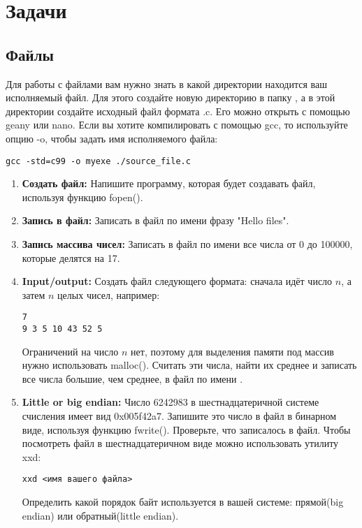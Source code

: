 \documentclass{article}
\begin{document}
\section*{Задачи}
\subsection*{Файлы}
Для работы с файлами вам нужно знать в какой директории находится ваш исполняемый файл. Для этого создайте новую директорию в папку , а в этой директории создайте исходный файл формата .c. Его можно открыть с помощью geany или nano. Если вы хотите компилировать с помощью gcc, то используйте опцию -o, чтобы задать имя исполняемого файла: 
\begin{verbatim}
gcc -std=c99 -o myexe ./source_file.c
\end{verbatim}
\begin{enumerate}
\item \textbf{Создать файл:} Напишите программу, которая будет создавать файл, используя функцию fopen().
\item \textbf{Запись в файл:} Записать в файл по имени  фразу "Hello files".
\item \textbf{Запись массива чисел:} Записать в файл по имени  все числа от 0 до 100000, которые делятся на 17.
\item \textbf{Input/output:} Создать файл  следующего формата: сначала идёт число $n$, а затем $n$ целых чисел, например:
\begin{verbatim}
7
9 3 5 10 43 52 5
\end{verbatim}
Ограничений на число $n$ нет, поэтому для выделения памяти под массив нужно использовать malloc(). Считать эти числа, найти их среднее и записать все числа большие, чем среднее, в файл по имени .
\item \textbf{Little or big endian:} Число 6242983 в шестнадцатеричной системе счисления имеет вид 0x005f42a7. Запишите это число в файл в бинарном виде, используя функцию fwrite(). Проверьте, что записалось в файл. Чтобы посмотреть файл в шестнадцатеричном виде можно использовать утилиту xxd:
\begin{verbatim}
xxd <имя вашего файла>
\end{verbatim}
Определить какой порядок байт используется в вашей системе: прямой(big endian) или обратный(little endian).
\end{enumerate}
\end{document}
